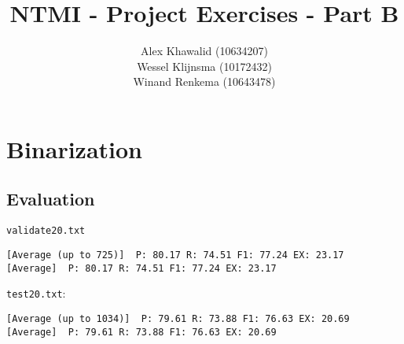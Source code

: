 \documentclass[a4paper, 10pt]{article}
\title{NTMI - Project Exercises - Part B}
\author{Alex Khawalid (10634207)\\
Wessel Klijnsma (10172432)\\
Winand Renkema (10643478)\\
}
\begin{document}
\maketitle

\section{Binarization}

\subsection{Evaluation}

\texttt{validate20.txt}
\begin{verbatim}
[Average (up to 725)]  P: 80.17 R: 74.51 F1: 77.24 EX: 23.17
[Average]  P: 80.17 R: 74.51 F1: 77.24 EX: 23.17
\end{verbatim}


\texttt{test20.txt}:
\begin{verbatim}
[Average (up to 1034)]  P: 79.61 R: 73.88 F1: 76.63 EX: 20.69
[Average]  P: 79.61 R: 73.88 F1: 76.63 EX: 20.69
\end{verbatim}
\end{document}
